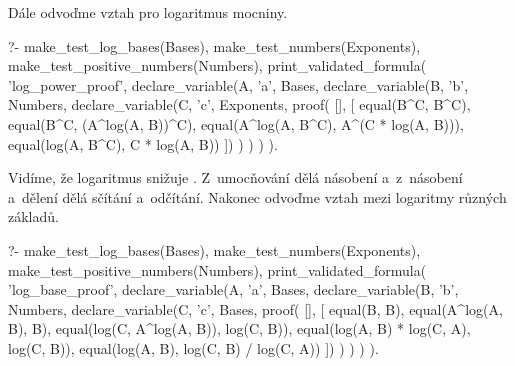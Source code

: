 Dále odvoďme vztah pro logaritmus mocniny.

\begin{prolog}
?-	make_test_log_bases(Bases),
	make_test_numbers(Exponents),
	make_test_positive_numbers(Numbers),
	print_validated_formula(
		'log_power_proof',
		declare_variable(A, 'a', Bases,
			declare_variable(B, 'b', Numbers,
				declare_variable(C, 'c', Exponents,
					proof(
					[],
					[
						equal(B^C, B^C),
						equal(B^C, (A^log(A, B))^C),
						equal(A^log(A, B^C), A^(C * log(A, B))),
						equal(log(A, B^C), C * log(A, B))
					])
				)
			)
		)
	).				
\end{prolog}

Vidíme, že logaritmus snižuje . Z~umocňování dělá násobení a~z~násobení a~dělení dělá sčítání a~odčítání. Nakonec odvoďme vztah mezi logaritmy různých základů.

\begin{prolog}
?-	make_test_log_bases(Bases),
	make_test_numbers(Exponents),
	make_test_positive_numbers(Numbers),
	print_validated_formula(
		'log_base_proof',
		declare_variable(A, 'a', Bases,
			declare_variable(B, 'b', Numbers,
				declare_variable(C, 'c', Bases,
					proof(
					[],
					[
						equal(B, B),
						equal(A^log(A, B), B),
						equal(log(C, A^log(A, B)), log(C, B)),
						equal(log(A, B) * log(C, A), log(C, B)),
						equal(log(A, B), log(C, B) / log(C, A))
					])
				)
			)
		)
	).				
\end{prolog}
